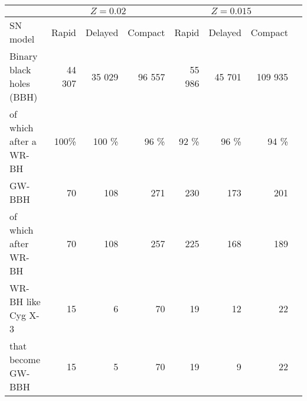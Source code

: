 \documentclass{standalone}
\begin{document}
	\begin{tabular}{lrrrrrrr}
		\toprule
		& \multicolumn{3}{c}{$Z=0.02$} & \multicolumn{3}{c}{$Z=0.015$}  \\
		\midrule
		SN model & Rapid & Delayed & Compact&  Rapid & Delayed & Compact\\
		\midrule
		Binary black holes (BBH)  		& 44 307 & 35 029 & 96 557 & 55 986 & 45 701 & 109 935 \\
		of which after a WR-BH			& 100\% & 100 \% & 96 \% & 92 \% & 96 \% & 94 \% \\
		\midrule
		GW-BBH  						& 70 & 108 & 271 & 230 & 173 & 201 \\
		of which after WR-BH			& 70 & 108 & 257 & 225 & 168 & 189 \\
		\midrule
		WR-BH like Cyg X-3  	 		& 15 & 6 & 70 & 19 & 12 & 22 \\
		that become GW-BBH   		 	& 15 & 5 & 70 & 19 & 9 & 22 \\
		\bottomrule 	
	\end{tabular}
\end{document}
